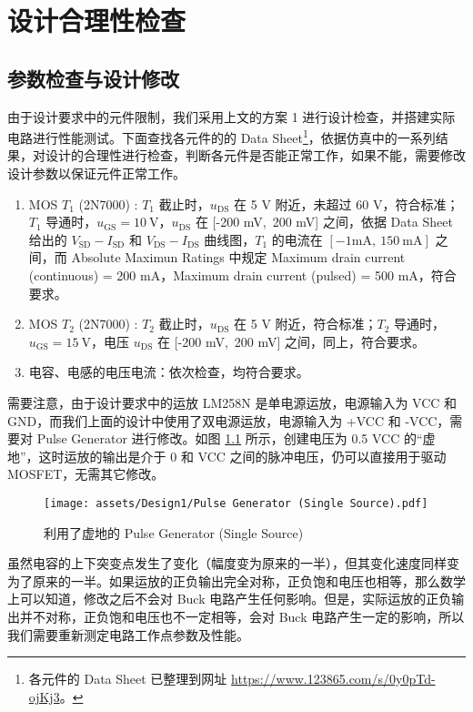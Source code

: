 \documentclass[UTF8]{article}
\theoremstyle{MyLineTheoremStyle} %
\theoremstyle{MyBlockTheoremStyle} %
\theoremstyle{MySubsubsectionStyle} %
\begin{document}
\section{设计合理性检查}

\subsection{参数检查与设计修改}
由于设计要求中的元件限制，我们采用上文的方案 1 进行设计检查，并搭建实际电路进行性能测试。下面查找各元件的的 Data Sheet\footnote{各元件的 Data Sheet 已整理到网址 \href{https://www.123865.com/s/0y0pTd-ojKj3}{https://www.123865.com/s/0y0pTd-ojKj3}。}，依据仿真中的一系列结果，对设计的合理性进行检查，判断各元件是否能正常工作，如果不能，需要修改设计参数以保证元件正常工作。

\begin{enumerate}
\item MOS $T_1$ (2N7000) : $T_1$ 截止时，$u_{\text{DS}}$ 在 5 V 附近，未超过 60 V，符合标准；$T_1$ 导通时，$u_{\text{GS}} = 10 \ \mathrm{V}$，$u_{\text{DS}}$ 在 [-200 mV,\ 200 mV] 之间，依据 Data Sheet 给出的 $V_{\text{SD}}-I_{\text{SD}}$ 和 $V_{\text{DS}}-I_{\text{DS}}$ 曲线图，$T_1$ 的电流在 $[-1 \mathrm{mA},\ 150\ \mathrm{mA}]$ 之间，而 Absolute Maximun Ratings 中规定 Maximum drain current (continuous) = 200 mA，Maximum drain current (pulsed)  = 500 mA，符合要求。

\item MOS $T_2$ (2N7000) : $T_2$ 截止时，$u_{\text{DS}}$ 在 5 V 附近，符合标准；$T_2$ 导通时，$u_{\text{GS}} = 15 \ \mathrm{V}$，电压 $u_{\text{DS}}$ 在 [-200 mV,\ 200 mV] 之间，同上，符合要求。

\item 电容、电感的电压电流：依次检查，均符合要求。
\end{enumerate}

需要注意，由于设计要求中的运放 LM258N 是单电源运放，电源输入为 VCC 和 GND，而我们上面的设计中使用了双电源运放，电源输入为 +VCC 和 -VCC，需要对 Pulse Generator 进行修改。如图 \ref{} 所示，创建电压为 0.5 VCC 的“虚地”，这时运放的输出是介于 0 和 VCC 之间的脉冲电压，仍可以直接用于驱动 MOSFET，无需其它修改。

\begin{figure}[H]\centering
    \texttt{[image: assets/Design1/Pulse Generator (Single Source).pdf]}
    \caption{利用了虚地的 Pulse Generator (Single Source)}
\end{figure}

虽然电容的上下突变点发生了变化（幅度变为原来的一半），但其变化速度同样变为了原来的一半。如果运放的正负输出完全对称，正负饱和电压也相等，那么数学上可以知道，修改之后不会对 Buck 电路产生任何影响。但是，实际运放的正负输出并不对称，正负饱和电压也不一定相等，会对 Buck 电路产生一定的影响，所以我们需要重新测定电路工作点参数及性能。
\end{document}
